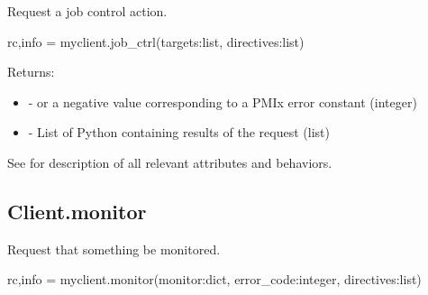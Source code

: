 \summary

Request a job control action.

\format

\pyspecificstart
\begin{codepar}
rc,info = myclient.job_ctrl(targets:list, directives:list)
\end{codepar}
\pyspecificend

\begin{arglist}
\end{arglist}

Returns:

\begin{itemize}
    \item {} -  or a negative value corresponding to a PMIx error constant (integer)
    \item {} - List of Python  containing results of the request (list)
\end{itemize}

See  for description of all relevant attributes and behaviors.


\subsection{Client.monitor}

\summary

Request that something be monitored.

\format

\pyspecificstart
\begin{codepar}
rc,info = myclient.monitor(monitor:dict, error_code:integer, directives:list)
\end{codepar}
\pyspecificend

\begin{arglist}
\end{arglist}

